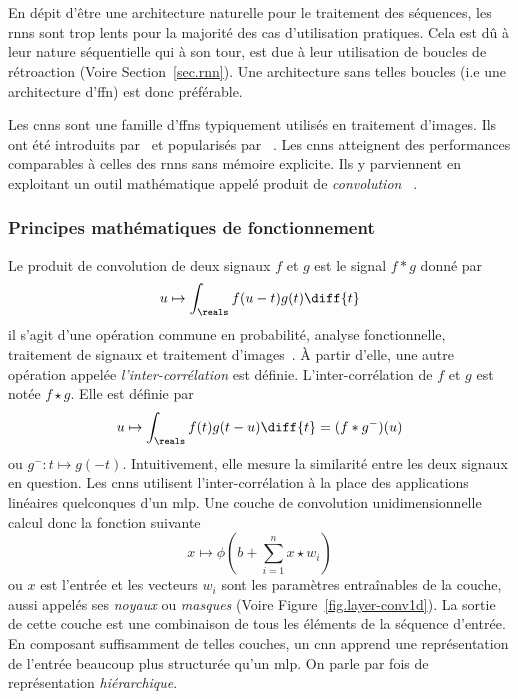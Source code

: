 \section{}
\label{sec.cnn}

En dépit d'être une architecture naturelle pour le traitement des séquences,
les \glspl{rnn} sont trop lents pour la majorité des cas d'utilisation pratiques.
Cela est dû à leur nature séquentielle qui à son tour, 
est due à leur utilisation de boucles de rétroaction (Voire Section~\ref{sec.rnn}).
Une architecture sans telles boucles (i.e une architecture d'\gls{ffn}) est donc préférable.

Les \glspl{cnn} sont une famille d'\glspl{ffn} typiquement utilisés en traitement d'images.
Ils ont été introduits par~\cite{Fukushima_1980} et popularisés par%
~\cite{LeCun_Boser_Denker_Henderson_Howard_Hubbard_Jackel_1989,Lecun_Bottou_Bengio_Haffner_1998}.
Les \glspl{cnn} atteignent des performances comparables à celles des \glspl{rnn} sans mémoire explicite.
Ils y parviennent en exploitant un outil mathématique appelé produit de \emph{convolution}%
~\cite{Calin_2020}.

\subsubsection{Principes mathématiques de fonctionnement}

Le produit de convolution de deux signaux \(f\) et \(g\) est le signal \(f \ast g\) donné par
\begin{equation}
    \label{eq.convolution}
    u \mapsto \int_\reals f(u-t)g(t)\diff{t}
\end{equation}
il s'agit d'une opération commune en probabilité, analyse fonctionnelle, 
traitement de signaux et traitement d'images~\cite{Barbe_Ledoux_2012,Oppenheim_Schafer_2013}.
À partir d'elle, une autre opération appelée \emph{l'inter-corrélation} est définie.
L'inter-corrélation de \(f\) et \(g\) est notée \(f\star g\).
Elle est définie par
\begin{equation}
    \label{eq.cros-corr}
    u \mapsto \int_\reals f(t)g(t-u)\diff{t} = (f \ast g^-)(u)
\end{equation}
ou \(g^- : t \mapsto g(-t)\).
Intuitivement, elle mesure la similarité entre les deux signaux en question.
Les \glspl{cnn} utilisent l'inter-corrélation à la place des applications linéaires quelconques d'un \gls{mlp}.
Une couche de convolution unidimensionnelle calcul donc la fonction suivante
\begin{equation}
    \label{eq.layer-conv1d}
    x \mapsto \phi\left(b + \sum_{i=1}^n x\star w_i\right)
\end{equation}
ou \(x\) est l'entrée et les vecteurs \(w_i\) sont les paramètres entraînables de la couche, 
aussi appelés ses \emph{noyaux} ou \emph{masques}
(Voire Figure~\ref{fig.layer-conv1d}).
La sortie de cette couche est une combinaison de tous les éléments de la séquence d'entrée.
En composant suffisamment de telles couches,
un \gls{cnn} apprend une représentation de l'entrée beaucoup plus structurée qu'un \gls{mlp}.
On parle par fois de représentation \emph{hiérarchique}.

